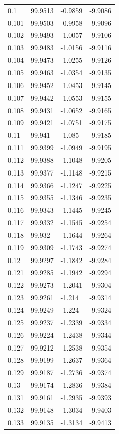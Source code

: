 \begin{tabular}{llll}
0.1 & 99.9513 & -0.9859 & -9.9086 \\
0.101 & 99.9503 & -0.9958 & -9.9096 \\
0.102 & 99.9493 & -1.0057 & -9.9106 \\
0.103 & 99.9483 & -1.0156 & -9.9116 \\
0.104 & 99.9473 & -1.0255 & -9.9126 \\
0.105 & 99.9463 & -1.0354 & -9.9135 \\
0.106 & 99.9452 & -1.0453 & -9.9145 \\
0.107 & 99.9442 & -1.0553 & -9.9155 \\
0.108 & 99.9431 & -1.0652 & -9.9165 \\
0.109 & 99.9421 & -1.0751 & -9.9175 \\
0.11 & 99.941 & -1.085 & -9.9185 \\
0.111 & 99.9399 & -1.0949 & -9.9195 \\
0.112 & 99.9388 & -1.1048 & -9.9205 \\
0.113 & 99.9377 & -1.1148 & -9.9215 \\
0.114 & 99.9366 & -1.1247 & -9.9225 \\
0.115 & 99.9355 & -1.1346 & -9.9235 \\
0.116 & 99.9343 & -1.1445 & -9.9245 \\
0.117 & 99.9332 & -1.1545 & -9.9254 \\
0.118 & 99.932 & -1.1644 & -9.9264 \\
0.119 & 99.9309 & -1.1743 & -9.9274 \\
0.12 & 99.9297 & -1.1842 & -9.9284 \\
0.121 & 99.9285 & -1.1942 & -9.9294 \\
0.122 & 99.9273 & -1.2041 & -9.9304 \\
0.123 & 99.9261 & -1.214 & -9.9314 \\
0.124 & 99.9249 & -1.224 & -9.9324 \\
0.125 & 99.9237 & -1.2339 & -9.9334 \\
0.126 & 99.9224 & -1.2438 & -9.9344 \\
0.127 & 99.9212 & -1.2538 & -9.9354 \\
0.128 & 99.9199 & -1.2637 & -9.9364 \\
0.129 & 99.9187 & -1.2736 & -9.9374 \\
0.13 & 99.9174 & -1.2836 & -9.9384 \\
0.131 & 99.9161 & -1.2935 & -9.9393 \\
0.132 & 99.9148 & -1.3034 & -9.9403 \\
0.133 & 99.9135 & -1.3134 & -9.9413 \\

\end{tabular}
